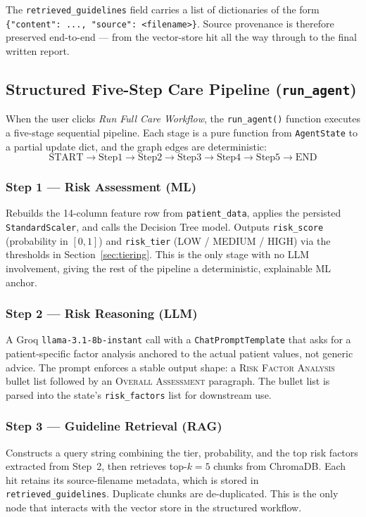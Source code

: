 \documentclass[11pt,a4paper]{article}
\begin{document}
\vspace{6pt}
The \texttt{retrieved\_guidelines} field carries a list of dictionaries of
the form \texttt{\{"content": ..., "source": <filename>\}}. Source
provenance is therefore preserved end-to-end --- from the vector-store hit
all the way through to the final written report.

\subsection{Structured Five-Step Care Pipeline (\texttt{run\_agent})}

When the user clicks \emph{Run Full Care Workflow}, the
\texttt{run\_agent()} function executes a five-stage sequential pipeline.
Each stage is a pure function from \texttt{AgentState} to a partial update
dict, and the graph edges are deterministic:
\[
\text{START} \to \text{Step1} \to \text{Step2} \to \text{Step3} \to \text{Step4} \to \text{Step5} \to \text{END}
\]

\subsubsection*{Step 1 --- Risk Assessment (ML)}
Rebuilds the 14-column feature row from \texttt{patient\_data}, applies the
persisted \texttt{StandardScaler}, and calls the Decision Tree model.
Outputs \texttt{risk\_score} (probability in $[0,1]$) and \texttt{risk\_tier}
(LOW / MEDIUM / HIGH) via the thresholds in Section~\ref{sec:tiering}. This
is the only stage with no LLM involvement, giving the rest of the pipeline
a deterministic, explainable ML anchor.

\subsubsection*{Step 2 --- Risk Reasoning (LLM)}
A Groq \texttt{llama-3.1-8b-instant} call with a \texttt{ChatPromptTemplate}
that asks for a patient-specific factor analysis anchored to the actual
patient values, not generic advice. The prompt enforces a stable output
shape: a \textsc{Risk Factor Analysis} bullet list followed by an
\textsc{Overall Assessment} paragraph. The bullet list is parsed into the
state's \texttt{risk\_factors} list for downstream use.

\subsubsection*{Step 3 --- Guideline Retrieval (RAG)}
Constructs a query string combining the tier, probability, and the top
risk factors extracted from Step~2, then retrieves top-$k{=}5$ chunks from
ChromaDB. Each hit retains its source-filename metadata, which is stored
in \texttt{retrieved\_guidelines}. Duplicate chunks are de-duplicated. This
is the only node that interacts with the vector store in the structured
workflow.
\end{document}
